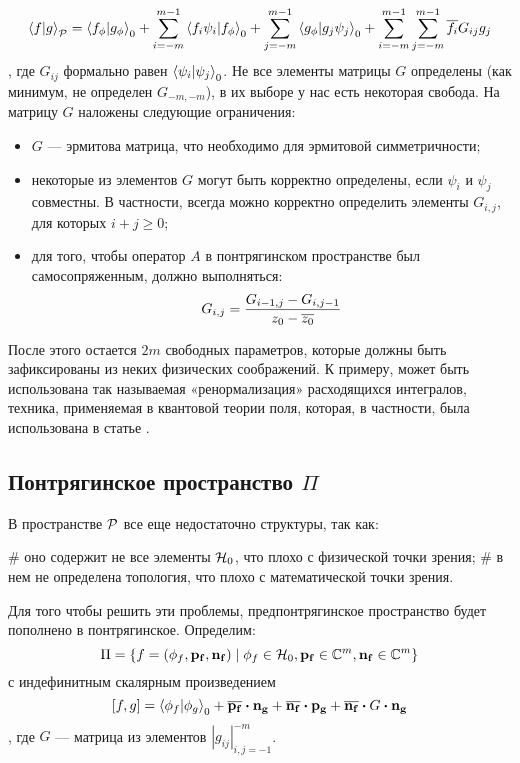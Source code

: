 \[
\ip{f}{g}_\mcP =
\ip{f_\phi}{g_\phi}_0 +
\sum\limits_{i = -m}^{m - 1} \ip{f_i \psi_i}{f_\phi}_0 +
\sum\limits_{j = -m}^{m - 1} \ip{g_\phi}{g_j \psi_j}_0 +
\sum\limits_{i = -m}^{m - 1} \sum\limits_{j = -m}^{m - 1} \cconj{f_i} G_{ij} g_j
\]
, где $G_{ij}$ формально равен $\ip{\psi_i}{\psi_j}_0$. Не все элементы матрицы $G$ определены (как минимум, не определен $G_{-m, -m}$), в их выборе у нас есть некоторая свобода. На матрицу $G$ наложены следующие ограничения:

\begin{itemize}
\item $G$ — эрмитова матрица, что необходимо для эрмитовой симметричности;
\item некоторые из элементов $G$ могут быть корректно определены, если $\psi_i$ и $\psi_j$ совместны. В частности, всегда можно корректно определить элементы $G_{i, j}$, для которых $i + j \ge 0$;
\item для того, чтобы оператор $A$ в понтрягинском пространстве был самосопряженным, должно выполняться:
\[
G_{i, j} = \frac{G_{i - 1, j} - G_{i, j - 1}}{z_0 - \overline{z_0}}
\]
\end{itemize}

После этого остается $2 m$ свободных параметров, которые должны быть зафиксированы из неких физических соображений. К примеру, может быть использована так называемая «ренормализация» расходящихся интегралов, техника, применяемая в квантовой теории поля, которая, в частности, была использована в статье \cite{berezin1963models}.

\subsection{Понтрягинское пространство $\Pi$}
В пространстве $\mathcal{P}$ все еще недостаточно структуры, так как:
\begin{ilist}
# оно содержит не все элементы $\mathcal{H}_{0}$, что плохо с физической точки зрения;
# в нем не определена топология, что плохо с математической точки зрения.
\end{ilist}

Для того чтобы решить эти проблемы, предпонтрягинское пространство будет пополнено в понтрягинское. Определим:
\[
\Pi = \{f = (\phi_f, \vb{p_f}, \vb{n_f}) \mid \phi_f \in \mathcal{H}_{0}, \vb{p_f} \in \mathbb{C}^m, \vb{n_f} \in \mathbb{C}^m \}
\]
с индефинитным скалярным произведением
\[
\iip{f}{g} =
\ip{\phi_f}{\phi_g}_0 +
\cconj{\vb{p_f}} \vdot \vb{n_g} +
\cconj{\vb{n_f}} \vdot \vb{p_g} + 
\cconj{\vb{n_f}} \vdot G \vdot \vb{n_g}
\]
, где $G$ — матрица из элементов $|g_{ij}|_{i, j = -1}^{-m}$. 

